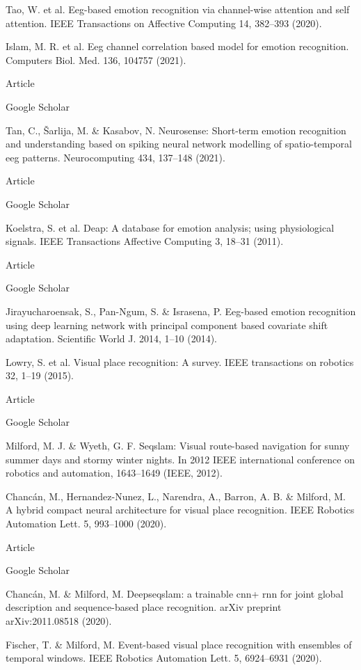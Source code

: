 Tao, W. et al. Eeg-based emotion recognition via channel-wise attention and self attention. IEEE Transactions on Affective Computing 14, 382–393 (2020).

Islam, M. R. et al. Eeg channel correlation based model for emotion recognition. Computers Biol. Med. 136, 104757 (2021).

Article
 
Google Scholar
 

Tan, C., Šarlija, M. & Kasabov, N. Neurosense: Short-term emotion recognition and understanding based on spiking neural network modelling of spatio-temporal eeg patterns. Neurocomputing 434, 137–148 (2021).

Article
 
Google Scholar
 

Koelstra, S. et al. Deap: A database for emotion analysis; using physiological signals. IEEE Transactions Affective Computing 3, 18–31 (2011).

Article
 
Google Scholar
 

Jirayucharoensak, S., Pan-Ngum, S. & Israsena, P. Eeg-based emotion recognition using deep learning network with principal component based covariate shift adaptation. Scientific World J. 2014, 1–10 (2014).

Lowry, S. et al. Visual place recognition: A survey. IEEE transactions on robotics 32, 1–19 (2015).

Article
 
Google Scholar
 

Milford, M. J. & Wyeth, G. F. Seqslam: Visual route-based navigation for sunny summer days and stormy winter nights. In 2012 IEEE international conference on robotics and automation, 1643–1649 (IEEE, 2012).

Chancán, M., Hernandez-Nunez, L., Narendra, A., Barron, A. B. & Milford, M. A hybrid compact neural architecture for visual place recognition. IEEE Robotics Automation Lett. 5, 993–1000 (2020).

Article
 
Google Scholar
 

Chancán, M. & Milford, M. Deepseqslam: a trainable cnn+ rnn for joint global description and sequence-based place recognition. arXiv preprint arXiv:2011.08518 (2020).

Fischer, T. & Milford, M. Event-based visual place recognition with ensembles of temporal windows. IEEE Robotics Automation Lett. 5, 6924–6931 (2020).


